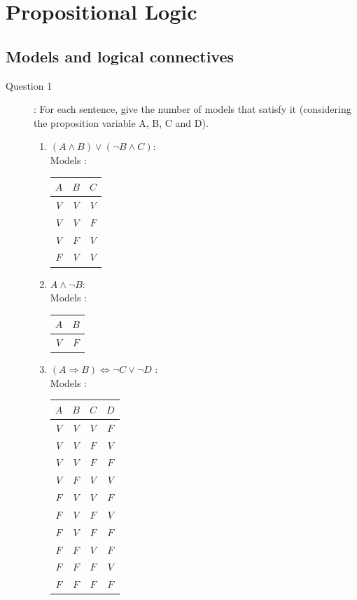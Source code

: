 \section{Propositional Logic}
\subsection{Models and logical connectives}
\begin{description}
\item[Question 1]: For each sentence, give the number of models that satisfy it (considering the proposition variable A, B, C and D). \\
\begin{enumerate}
\item $(A \wedge B) \vee ( \neg B \wedge C)$:\\
Models : \\
\begin{center}
\begin{tabular}{|c|c|c|}
\hline
$A$ & $B$ & $C$ \\
\hline
$V$ & $V$ & $V$\\
$V$ & $V$ & $F$\\
$V$ & $F$ & $V$\\
$F$ & $V$ & $V$\\
\hline
\end{tabular}
\end{center}
\item $A \wedge \neg B$:\\
Models : \\
\begin{center}
\begin{tabular}{|c|c|}
\hline
$A$ & $B$\\
\hline
$V$ & $F$ \\
\hline
\end{tabular}
\end{center}
\item $(A \Rightarrow B) \Leftrightarrow \neg C \vee \neg D$ : \\
Models : \\
\begin{center}
\begin{tabular}{|c|c|c|c|}
\hline
$A$ & $B$ & $C$ & $D$\\
\hline
$V$ & $V$ & $V$ & $F$\\
$V$ & $V$ & $F$ & $V$\\
$V$ & $V$ & $F$ & $F$\\
$V$ & $F$ & $V$ & $V$\\
$F$ & $V$ & $V$ & $F$\\
$F$ & $V$ & $F$ & $V$\\
$F$ & $V$ & $F$ & $F$\\
$F$ & $F$ & $V$ & $F$\\
$F$ & $F$ & $F$ & $V$\\
$F$ & $F$ & $F$ & $F$\\
\hline
\end{tabular}
\end{center}
\end{enumerate}
\end{description}


